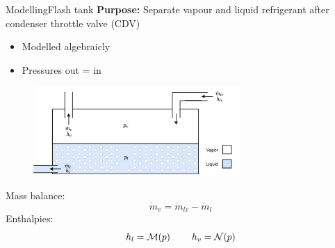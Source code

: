 \begin{frame}{Modelling}{Flash tank}
	\textbf{Purpose:} Separate vapour and liquid refrigerant after condenser throttle valve (CDV)
	\begin{itemize}
		\item Modelled algebraicly
		\item Pressures out = in
	\end{itemize}
	\begin{figure}[h!]
		\centering
		\includegraphics[width=0.7\textwidth]{../Graphics/Flash_tank.pdf}
		\label{fig:flash_tank_CV}
	\end{figure}
	Mass balance:
\begin{equation}
	\dot{m}_{v} = \dot{m}_{lv} - \dot{m}_{l}  \label{eq:Flash_tank_massflow}
\end{equation}
Enthalpies:
\begin{equation}
	h_{l} = \mathcal{M}(p) \hspace{0.8cm} h_{v} = \mathcal{N}(p)
\end{equation}
\end{frame}




